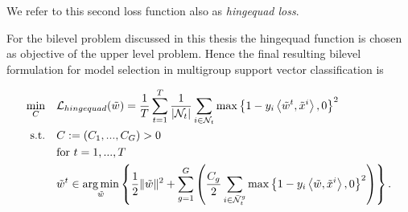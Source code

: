 We refer to this second loss function also as \emph{hingequad loss}.



For the bilevel problem discussed in this thesis the hingequad function is chosen as objective of the upper level problem.
Hence the final resulting bilevel formulation for model selection in multigroup support vector classification is 

%

\begin{align}
\begin{split}
	\min_{C} \quad &  \mathcal{L}_{hingequad}(\tilde{w}) = \frac{1}{T}\sum_{t=1}^T\frac{1}{|\mathcal{N}_t|}\sum_{i \in \mathcal{N}_t}{\max\left\{1-y_i\left\langle \tilde{w}^t,\tilde{x}^i\right\rangle,0\right\}^2}\\
	\text{s.t.} \quad & C := (C_1,...,C_G) > 0 \\
	& \text{for } t = 1,...,T \\
	& \tilde{w}^t \in \operatorname*{arg\,min}_{\tilde{w}}\left\{ \frac{1}{2} \|\tilde{w}\|^2+\sum_{g=1}^G\left(\frac{C_g}{2}\sum_{i\in \bar{\mathcal{N}}_t^g}\max\left\{1-y_i\left\langle \tilde{w},\tilde{x}^i\right\rangle,0\right\}^2\right)\right\}. \\
\end{split}
\label{bilevel_fin}
\end{align}

